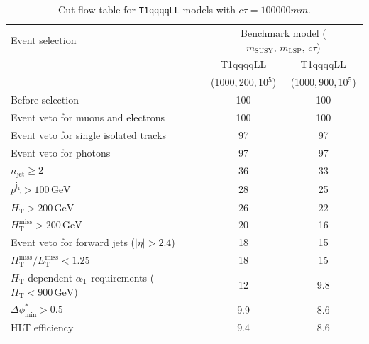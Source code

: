 \begin{table}[!h]
  \caption{Cut flow table for \texttt{T1qqqqLL} models with $c\tau = 100000\unit{mm}$.} 
  \label{tab:cut_flow_ctau_100000}
{\scriptsize%
\centering
\begin{tabular}{lcc}
  \hline
  Event selection & \multicolumn{2}{c}{Benchmark model ($m_\mathrm{SUSY},\,m_\mathrm{LSP},\,c\tau$)} \\
  \cline{2-3}
   & T1qqqqLL & T1qqqqLL \\
    & (1000,\,200,\,10$^5$) & (1000,\,900,\,10$^5$) \\
  \hline
  Before selection  & 100\phantom{.1} & 100\phantom{.1} \\
  Event veto for muons and electrons & 100\phantom{.1} & 100\phantom{.1} \\
  Event veto for single isolated tracks & \phantom{1}97\phantom{.1} & \phantom{1}97\phantom{.1} \\
  Event veto for photons & \phantom{1}97\phantom{.1} & \phantom{1}97\phantom{.1} \\
   $n_{\mathrm{jet}} \geq 2$  & \phantom{1}36\phantom{.1} & \phantom{1}33\phantom{.1} \\
   $p_{\mathrm{T}}^{\mathrm{j_1}} > 100\,\mathrm{GeV}$ & \phantom{1}28\phantom{.1} & \phantom{1}25\phantom{.1} \\
   $H_{\mathrm{T}} > 200\,\mathrm{GeV}$  & \phantom{1}26\phantom{.1} & \phantom{1}22\phantom{.1} \\
  $H_{\mathrm{T}}^{\mathrm{miss}} > 200\,\mathrm{GeV}$  & \phantom{1}20\phantom{.1} & \phantom{1}16\phantom{.1} \\
  Event veto for forward jets ($|\eta| > 2.4$) & \phantom{1}18\phantom{.1} & \phantom{1}15\phantom{.1} \\
  $H_{\mathrm{T}}^{\mathrm{miss}} / E_{\mathrm{T}}^{\mathrm{miss}} < 1.25$ & \phantom{1}18\phantom{.1} & \phantom{1}15\phantom{.1} \\
  $H_{\mathrm{T}}$-dependent $\alpha_{\mathrm{T}}$ requirements ($H_{\mathrm{T}} < 900\,\mathrm{GeV}$)  &  \phantom{1}12 \phantom{.1} & \phantom{10}9.8 \\
  $\Delta\phi^{*}_{\mathrm{min}} > 0.5$  &  \phantom{10}9.9 & \phantom{10}8.6 \\
  \hline
  HLT efficiency &  \phantom{10}9.4 &  \phantom{10}8.6 \\
  \hline
\end{tabular}
}
\end{table}

\clearpage
